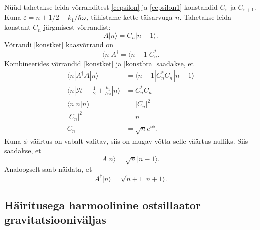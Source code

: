 \documentclass{trkut}%
\renewcommand\bra[1]{{\langle{#1}|}}
\renewcommand\ket[1]{{|{#1}\rangle}}
\renewcommand\braket[1]{\langle{#1}\rangle}
\begin{document}
Nüüd tahetakse leida võrranditest \eqref{cepsilon} ja \eqref{cepsilon1} konstandid $C_\varepsilon$ ja $C_{\varepsilon+1}$. Kuna $\varepsilon=n+1/2 - k_1/\hbar \omega$, tähistame kette täisarvuga $n$. Tahetakse leida konstant $C_n$ järgmisest võrrandist:
\begin{equation}
    A\ket{n}=C_n \ket{n -1}.
    \label{konstket}
\end{equation}
Võrrandi \eqref{konstket} kaasvõrrand on
\begin{equation}
    \bra{n}A^\dagger=\bra{n-1}C_n^*.
    \label{konstbra}
\end{equation}
Kombineerides võrrandid \eqref{konstket} ja \eqref{konstbra} saadakse, et
\begin{align}
    \braket{n|A^\dagger A|n}&=\braket{n-1|C_n^* C_n| n-1} \\
    \braket{n|\mathcal{H}-\tfrac{1}{2}+\tfrac{k_1}{\hbar \omega}|n}&=C_n^* C_n \\
    \braket{n|n|n}&=|C_n|^2 \\
    |C_n|^2&=n \\
    C_n&=\sqrt{n} e^{i\phi}.
\end{align}
Kuna $\phi$ väärtus on vabalt valitav, siis on mugav võtta selle väärtus nulliks. Siis saadakse, et
\begin{equation}
    A\ket{n}=\sqrt{n}\ket{n-1}.
\end{equation}
Analoogselt saab näidata, et
\begin{equation}
    A^\dagger \ket{n}=\sqrt{n+1}\ket{n+1}.
\end{equation}

\subsection{Häiritusega harmoolinine ostsillaator gravitatsiooniväljas}
\end{document}
